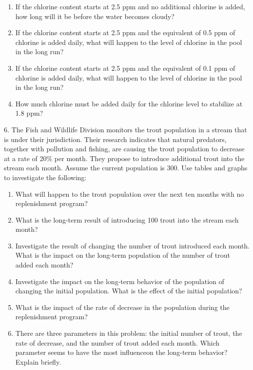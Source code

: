 \documentclass[10pt,]{book}
\theoremstyle{plain}
\theoremstyle{definition}
\theoremstyle{definition}
\theoremstyle{definition}
\numberwithin{equation}{section}
\begin{document}
\begin{exerciselist}
\begin{enumerate}[label=(\alph*)]
\item\hypertarget{li-21}{}If the chlorine content starts at 2.5 ppm and no additional chlorine is added, how long will it be before the water becomes cloudy?%
\item\hypertarget{li-22}{}If the chlorine content starts at 2.5 ppm and the equivalent of 0.5 ppm of chlorine is added daily, what will happen to the level of chlorine in the pool in the long run?%
\item\hypertarget{li-23}{}If the chlorine content starts at 2.5 ppm and the equivalent of 0.1 ppm of chlorine is added daily, what will happen to the level of chlorine in the pool in the long run?%
\item\hypertarget{li-24}{}How much chlorine must be added daily for the chlorine level to stabilize at 1.8 ppm?%
\end{enumerate}
%
\par\smallskip
\item[6.]\hypertarget{exercise-8}{}The Fish and Wildlife Division monitors the trout population in a stream that is under their jurisdiction.  Their research indicates that natural predators, together with pollution and fishing, are causing the trout population to decrease at a rate of \(20\%\) per month.  They propose to introduce additional trout into the stream each month.  Assume the current population is 300.  Use tables and graphs to investigate the following: \leavevmode%
\begin{enumerate}[label=(\alph*)]
\item\hypertarget{li-25}{}What will happen to the trout population over the next ten months with no replenishment program?%
\item\hypertarget{li-26}{}What is the long-term result of introducing 100 trout into the stream each month?%
\item\hypertarget{li-27}{}Investigate the result of changing the number of trout introduced each month.  What is the impact on the long-term population of the number of trout added each month?%
\item\hypertarget{li-28}{}Investigate the impact on the long-term behavior of the population of changing the initial population.  What is the effect of the initial population?%
\item\hypertarget{li-29}{}What is the impact of the rate of decrease in the population during the replenishment program?%
\item\hypertarget{li-30}{}There are three parameters in this problem: the initial number of trout, the rate of decrease, and the number of trout added each month. Which parameter seems to have the most influenceon the long-term behavior? Explain briefly.%

\end{enumerate}
\end{exerciselist}
\end{document}
